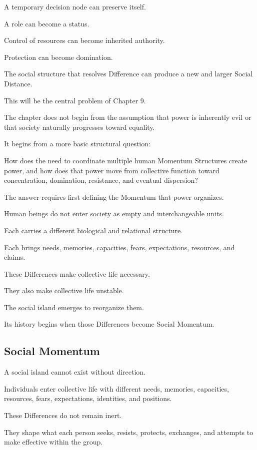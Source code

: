 A temporary decision node can preserve itself.

A role can become a status.

Control of resources can become inherited authority.

Protection can become domination.

The social structure that resolves Difference can produce a new and larger Social Distance.

This will be the central problem of Chapter 9.

The chapter does not begin from the assumption that power is inherently evil or that society naturally progresses toward equality.

It begins from a more basic structural question:

How does the need to coordinate multiple human Momentum Structures create power, and how does that power move from collective function toward concentration, domination, resistance, and eventual dispersion?

The answer requires first defining the Momentum that power organizes.

Human beings do not enter society as empty and interchangeable units.

Each carries a different biological and relational structure.

Each brings needs, memories, capacities, fears, expectations, resources, and claims.

These Differences make collective life necessary.

They also make collective life unstable.

The social island emerges to reorganize them.

Its history begins when those Differences become Social Momentum.

\subsection*{\textbf{Social Momentum}}


A social island cannot exist without direction.

Individuals enter collective life with different needs, memories, capacities, resources, fears, expectations, identities, and positions.

These Differences do not remain inert.

They shape what each person seeks, resists, protects, exchanges, and attempts to make effective within the group.

